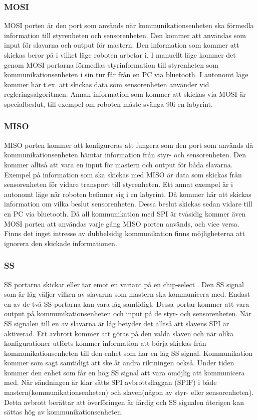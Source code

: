 \subsubsection{MOSI}
MOSI porten är den port som används när kommunikationsenheten ska förmedla
information till styrenheten och sensorenheten. Den kommer att användas som
input för slavarna och output för mastern. Den information som kommer att
skickas beror på i vilket läge roboten arbetar i. I manuellt läge kommer det
genom MOSI portarna förmedlas styrinformation till styrenheten som
kommunikationsenheten i sin tur får från en PC via bluetooth. I autonomt läge
kommer här t.ex. att skickas data som sensorenheten använder vid
regleringsalgoritmen. Annan information som kommer att skickas via MOSI är
specialbeslut, till exempel om roboten måste svänga 90\degree i en labyrint.

\subsubsection{MISO}
MISO porten kommer att konfigureras att fungera som den port som används då kommunikationsenheten hämtar information från styr- och sensorenheten. Den kommer alltså att vara en input för mastern och output för båda slavarna. Exempel på information som ska skickas med MISO är data som skickas från sensorenheten för vidare transport till styrenheten. Ett annat exempel är i autonomt läge när roboten befinner sig i en labyrint. Då kommer här att skickas information om vilka beslut sensorenheten. Dessa beslut skickas sedan vidare till en PC via bluetooth.
Då all kommunikation med SPI är tvåsidig kommer även MOSI porten att användas varje gång MISO porten används, och vice versa. Finns det inget intresse av dubbelsidig kommunikation finns möjligheterna att ignorera den skickade informationen.

\subsubsection{SS}
SS portarna skickar eller tar emot en variant på en chip-select . Den SS signal som är låg väljer vilken av slavarna som mastern ska kommunicera med. Endast en av de två SS portarna kan vara låg samtidigt. Dessa portar kommer att vara output på kommunikationsenheten och input på de styr- och sensorenheten.
När SS signalen till en av slavarna är låg betyder det alltså att slavens SPI är aktiverad. Ett avbrott kommer att göras på den valda slaven och när olika konfigurationer utförts kommer information att börja skickas från kommunikationsenheten till den enhet som har en låg SS signal. Kommunikation kommer som sagt samtidigt att ske åt andra riktningen också. Under tiden kommer den enhet som får en hög SS signal att vara omöjlig att kommunicera med.
När sändningen är klar sätts SPI avbrottsflaggan (SPIF) i både mastern(kommunikationsenheten) och slaven(någon av styr- eller sensorenheten). Detta avbrott berättar att överföringen är färdig och SS signalen återigen kan sättas hög av kommunikationsenheten.


